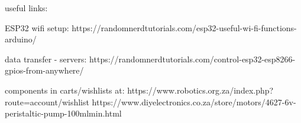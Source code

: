 useful links:

ESP32 wifi setup: https://randomnerdtutorials.com/esp32-useful-wi-fi-functions-arduino/

data transfer - servers: 
https://randomnerdtutorials.com/control-esp32-esp8266-gpios-from-anywhere/

components in carts/wishlists at: 
https://www.robotics.org.za/index.php?route=account/wishlist
https://www.diyelectronics.co.za/store/motors/4627-6v-peristaltic-pump-100mlmin.html